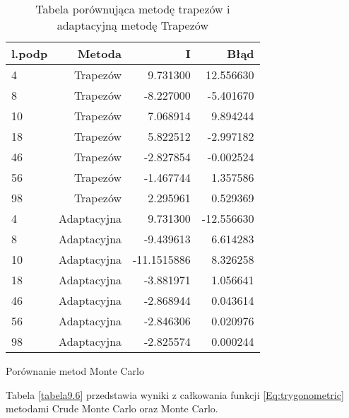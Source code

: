 \documentclass[12pt,twoside]{article}
\begin{document}
\begin{table}
\centering 
\caption{Tabela porównująca metodę trapezów i adaptacyjną metodę Trapezów}
\label{tabela9.5}
\begin{tabular}{lrrr}
\toprule
{l.podp} & Metoda &  I &  Błąd \\
\midrule
4  &     Trapezów & 9.731300  &   12.556630 \\
8  &     Trapezów & -8.227000 &   -5.401670 \\
10  &     Trapezów & 7.068914   &   9.894244  \\
18  &    Trapezów & 5.822512  &   -2.997182  \\
46  &    Trapezów & -2.827854 &    -0.002524   \\
56 &     Trapezów & -1.467744  &   1.357586  \\
98 &     Trapezów & 2.295961 &   0.529369  \\

4  &     Adaptacyjna & 9.731300 &   -12.556630 \\
8  &     Adaptacyjna & -9.439613 &   6.614283 \\
10  &     Adaptacyjna & -11.1515886  &   8.326258  \\
18  &     Adaptacyjna & -3.881971 &  1.056641  \\
46  &    Adaptacyjna & -2.868944 &   0.043614  \\
56 &     Adaptacyjna & -2.846306 &    0.020976  \\
98 &     Adaptacyjna & -2.825574 &    0.000244  \\

\bottomrule
\end{tabular}
\end{table}


Porównanie metod Monte Carlo

Tabela \eqref{tabela9.6} przedstawia wyniki z całkowania funkcji \eqref{Eq:trygonometric} metodami Crude Monte Carlo oraz Monte Carlo.
\end{document}

